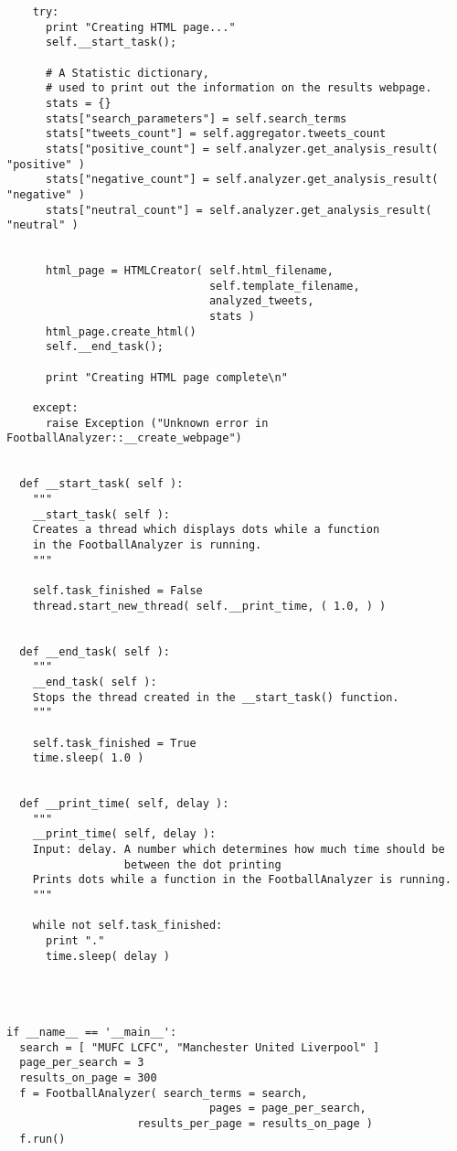 \begin{verbatim}
    try:
      print "Creating HTML page..."
      self.__start_task();
      
      # A Statistic dictionary, 
      # used to print out the information on the results webpage.
      stats = {}
      stats["search_parameters"] = self.search_terms
      stats["tweets_count"] = self.aggregator.tweets_count
      stats["positive_count"] = self.analyzer.get_analysis_result( "positive" )
      stats["negative_count"] = self.analyzer.get_analysis_result( "negative" )
      stats["neutral_count"] = self.analyzer.get_analysis_result( "neutral" )
      

      html_page = HTMLCreator( self.html_filename, 
                               self.template_filename, 
                               analyzed_tweets, 
                               stats )
      html_page.create_html()
      self.__end_task();
      
      print "Creating HTML page complete\n"
    
    except:
      raise Exception ("Unknown error in FootballAnalyzer::__create_webpage")
  
  
  def __start_task( self ):
    """
    __start_task( self ):
    Creates a thread which displays dots while a function 
    in the FootballAnalyzer is running.
    """
    
    self.task_finished = False
    thread.start_new_thread( self.__print_time, ( 1.0, ) )
  
  
  def __end_task( self ):
    """
    __end_task( self ):
    Stops the thread created in the __start_task() function.
    """
    
    self.task_finished = True
    time.sleep( 1.0 )
  
  
  def __print_time( self, delay ):
    """
    __print_time( self, delay ):
    Input: delay. A number which determines how much time should be 
                  between the dot printing
    Prints dots while a function in the FootballAnalyzer is running.
    """
    
    while not self.task_finished:
      print "."
      time.sleep( delay )




if __name__ == '__main__':
  search = [ "MUFC LCFC", "Manchester United Liverpool" ]
  page_per_search = 3
  results_on_page = 300
  f = FootballAnalyzer( search_terms = search, 
                               pages = page_per_search, 
                    results_per_page = results_on_page )
  f.run()
\end{verbatim}

